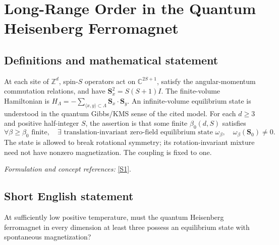 \documentclass[11pt]{article}
\newcommand{\Z}{\mathbb{Z}}
\newcommand{\C}{\mathbb{C}}
\newcommand{\sref}[2]{\hyperlink{source:#1:#2}{[S#2]}}
\newif\ifshowcatalogue
\newcommand{\cataloguescope}[1]{\ifshowcatalogue
	\paragraph{Exact scope in the supplied catalogue.}
	\begin{quote}\small #1\end{quote}\fi}
\begin{document}
\setcounter{section}{201}
	\clearpage
	\section{\texorpdfstring{Long-Range Order in the Quantum Heisenberg Ferromagnet}{Long-Range Order in the Quantum Heisenberg Ferromagnet}}\label{202}
	\subsection{Definitions and mathematical statement}
	At each site of $\Z^d$, spin-$S$ operators act on $\C^{2S+1}$, satisfy the angular-momentum commutation relations, and have $\mathbf S_x^2=S(S+1)I$. The finite-volume Hamiltonian is
	$H_\Lambda=-\sum_{\langle x,y\rangle\subset\Lambda}\mathbf S_x\cdot\mathbf S_y$.
	An infinite-volume equilibrium state is understood in the quantum Gibbs/KMS sense of the cited model. For each $d\ge3$ and positive half-integer $S$, the assertion is that some finite $\beta_0(d,S)$ satisfies
	\[
	\forall\beta\ge\beta_0\text{ finite},\quad
	\exists\text{ translation-invariant zero-field equilibrium state }\omega_\beta,
	\quad\omega_\beta(\mathbf S_0)\ne0.
	\]
	The state is allowed to break rotational symmetry; its rotation-invariant mixture need not have nonzero magnetization. The coupling is fixed to one.
	\par\smallskip\textit{Formulation and concept references:} \sref{202}{1}.
	\cataloguescope{For the nearest-neighbor isotropic spin-S quantum Heisenberg ferromagnet on Z\textasciicircum{}d with Hamiltonian H=-sum\_\{<x,y>\} S\_x dot S\_y, assert: for every integer d>=3 and every S in\{1/2,1,3/2,...\}, there is a finite beta\_0(d,S)>0 such that for each finite beta>=beta\_0 the infinite-volume zero-field model admits a translation-invariant equilibrium Gibbs state with nonzero spin expectation. Nonzero expectation refers to spontaneous magnetization in a symmetry-breaking state, not the rotation-invariant mixture. Coupling J=1 fixes temperature units; no pointwise-correlation equivalence is asserted.}
	\subsection{Short English statement}
	At sufficiently low positive temperature, must the quantum Heisenberg ferromagnet in every dimension at least three possess an equilibrium state with spontaneous magnetization?
\end{document}
